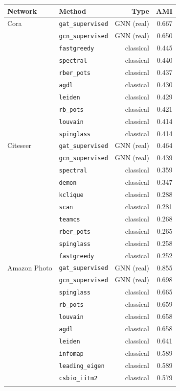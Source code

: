 \small
\begin{tabular}{llrr}
\toprule
\textbf{Network} & \textbf{Method} & \textbf{Type} & \textbf{AMI} \\
\midrule
Cora & \texttt{gat\_supervised} & GNN (real) & 0.667 \\
 & \texttt{gcn\_supervised} & GNN (real) & 0.650 \\
 & \texttt{fastgreedy} & classical & 0.445 \\
 & \texttt{spectral} & classical & 0.440 \\
 & \texttt{rber\_pots} & classical & 0.437 \\
 & \texttt{agdl} & classical & 0.430 \\
 & \texttt{leiden} & classical & 0.429 \\
 & \texttt{rb\_pots} & classical & 0.421 \\
 & \texttt{louvain} & classical & 0.414 \\
 & \texttt{spinglass} & classical & 0.414 \\
\addlinespace[4pt]
Citeseer & \texttt{gat\_supervised} & GNN (real) & 0.464 \\
 & \texttt{gcn\_supervised} & GNN (real) & 0.439 \\
 & \texttt{spectral} & classical & 0.359 \\
 & \texttt{demon} & classical & 0.347 \\
 & \texttt{kclique} & classical & 0.288 \\
 & \texttt{scan} & classical & 0.281 \\
 & \texttt{teamcs} & classical & 0.268 \\
 & \texttt{rber\_pots} & classical & 0.265 \\
 & \texttt{spinglass} & classical & 0.258 \\
 & \texttt{fastgreedy} & classical & 0.252 \\
\addlinespace[4pt]
Amazon Photo & \texttt{gat\_supervised} & GNN (real) & 0.855 \\
 & \texttt{gcn\_supervised} & GNN (real) & 0.698 \\
 & \texttt{spinglass} & classical & 0.665 \\
 & \texttt{rb\_pots} & classical & 0.659 \\
 & \texttt{louvain} & classical & 0.658 \\
 & \texttt{agdl} & classical & 0.658 \\
 & \texttt{leiden} & classical & 0.641 \\
 & \texttt{infomap} & classical & 0.589 \\
 & \texttt{leading\_eigen} & classical & 0.589 \\
 & \texttt{csbio\_iitm2} & classical & 0.579 \\
\addlinespace[4pt]
\bottomrule
\end{tabular}
\normalsize